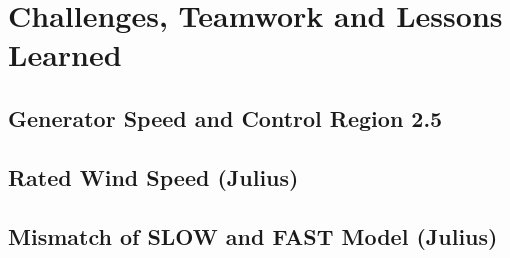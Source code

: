 \chapter{Challenges, Teamwork and Lessons Learned}

\section{Generator Speed and Control Region 2.5}

\section{Rated Wind Speed (Julius)} \label{RatedWindSpeed}


\section{Mismatch of SLOW and FAST Model (Julius)}

